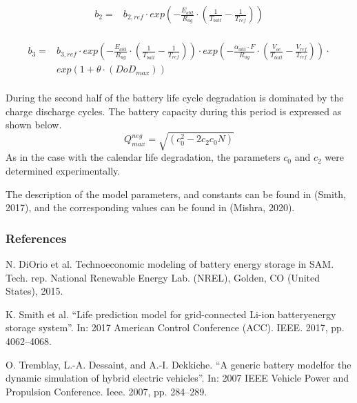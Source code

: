 \begin{equation}
\begin{split}
    b_2 = & b_{2,ref} \cdot exp\left(-\frac{E_{ab2}}{R_{ug}} \cdot \left(\frac{1}{T_{batt}} - \frac{1}{T_{ref}}\right) \right) \\
\end{split}
\label{Equation: b2_computation}
\end{equation}

\begin{equation}
\begin{split}
    b_3 = & b_{3,ref} \cdot exp\left(-\frac{E_{ab3}}{R_{ug}} \cdot \left(\frac{1}{T_{batt}} - \frac{1}{T_{ref}}\right) \right) \cdot
exp\left(-\frac{\alpha_{ab3}\cdot F}{R_{ug}} \cdot \left(\frac{V_{oc}}{T_{batt}} - \frac{V_{ref}}{T_{ref}}\right) \right) \cdot  \\
& exp\left(1 + \theta \cdot (DoD_{max})\right) \\
\end{split}
\label{Equation: b3_computation}
\end{equation}

During the second half of the battery life cycle degradation is dominated by the charge discharge cycles. The battery capacity during this period is expressed as shown below.  
\begin{equation}
Q_{max}^{neg}=\sqrt{(c_0^2-2c_2 c_0 N)}                             
\label{Equation: qmax_computation_a}
\end{equation}
As in the case with the calendar life degradation, the parameters $c_0$ and $c_2$ were determined experimentally. 

The description of the model parameters, and constants can be found in (Smith, 2017), and the corresponding values can be found in (Mishra, 2020).

\subsubsection{References}\label{references-022-b}

N. DiOrio et al. Technoeconomic modeling of battery energy storage in SAM. Tech. rep. National Renewable Energy Lab. (NREL), Golden, CO (United States), 2015.

\noindent
K.  Smith  et  al.  “Life  prediction  model  for  grid-connected  Li-ion  batteryenergy  storage  system”.  In: 2017 American Control Conference (ACC). IEEE. 2017, pp. 4062–4068.

\noindent
O. Tremblay, L.-A. Dessaint, and A.-I. Dekkiche. “A generic battery modelfor the dynamic simulation of hybrid electric vehicles”. In: 2007 IEEE Vehicle Power and Propulsion Conference. Ieee. 2007, pp. 284–289.

